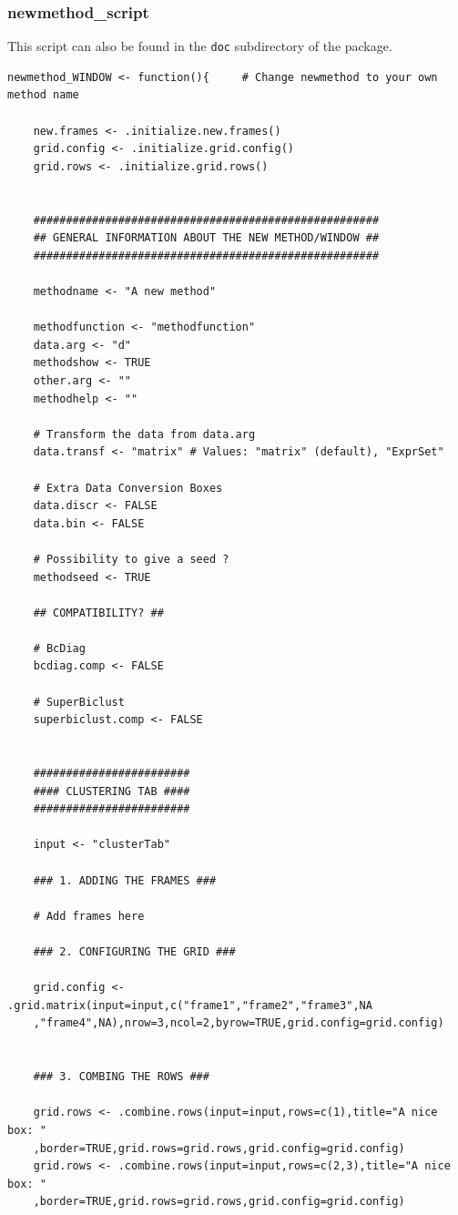 \documentclass[a4paper]{article}\usepackage[]{graphicx}\usepackage[]{color}
\begin{document}
\subsubsection{newmethod\_script}
\noindent This script can also be found in the \verb|doc| subdirectory of the
package.
\begin{verbatim}
newmethod_WINDOW <- function(){     # Change newmethod to your own method name
	
	new.frames <- .initialize.new.frames()
	grid.config <- .initialize.grid.config()
	grid.rows <- .initialize.grid.rows()
	
	
	#####################################################
	## GENERAL INFORMATION ABOUT THE NEW METHOD/WINDOW ##
	#####################################################

	methodname <- "A new method"

	methodfunction <- "methodfunction"
	data.arg <- "d"
	methodshow <- TRUE
	other.arg <- ""
	methodhelp <- ""

	# Transform the data from data.arg
	data.transf <- "matrix" # Values: "matrix" (default), "ExprSet"

	# Extra Data Conversion Boxes
	data.discr <- FALSE
	data.bin <- FALSE
		
	# Possibility to give a seed ?
	methodseed <- TRUE
	
	## COMPATIBILITY? ##
	
	# BcDiag
	bcdiag.comp <- FALSE
	
	# SuperBiclust
	superbiclust.comp <- FALSE
	
		
	########################
	#### CLUSTERING TAB ####
	########################
	
	input <- "clusterTab"
	
	### 1. ADDING THE FRAMES ###
	
	# Add frames here
	
	### 2. CONFIGURING THE GRID ###
	
	grid.config <- .grid.matrix(input=input,c("frame1","frame2","frame3",NA
    ,"frame4",NA),nrow=3,ncol=2,byrow=TRUE,grid.config=grid.config)
	
	
	### 3. COMBING THE ROWS ###

	grid.rows <- .combine.rows(input=input,rows=c(1),title="A nice box: "
    ,border=TRUE,grid.rows=grid.rows,grid.config=grid.config)
	grid.rows <- .combine.rows(input=input,rows=c(2,3),title="A nice box: "
    ,border=TRUE,grid.rows=grid.rows,grid.config=grid.config)
	
	
	

\end{verbatim}
\end{document}
